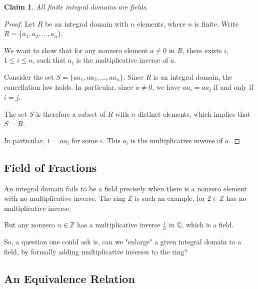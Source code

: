 \documentclass[a4paper,12pt]{report}
\newcounter{statement}
\numberwithin{statement}{chapter}
\newtheorem{claim}[statement]{Claim}
\numberwithin{equation}{chapter}
\numberwithin{section}{chapter}
\numberwithin{subsection}{section}
\begin{document}
\begin{claim}
All finite integral domains are fields.
\end{claim}
\begin{proof}

Let $R$ be an integral domain with $n$ elements, where $n$ is finite.
Write $R = \{a_1, a_2, \ldots, a_{n}\}$.


We want to show that for any nonzero element $a \neq 0$ in $R$,
there exists $i$, $1 \leq i \leq n$,
such that $a_i$ is the multiplicative inverse of $a$.


Consider the set $S = \{aa_1, aa_2,\ldots, aa_{n}\}$.
Since $R$ is an integral domain, the cancellation law holds.
In particular, since $a \neq 0$, we have $aa_i = aa_j$ if and only if $i = j$.


The set $S$ is therefore a subset of $R$ with $n$ distinct elements, which implies that $S = R$.


In particular, $1 = aa_i$ for some $i$.  This $a_i$ is the multiplicative inverse of $a$.


\end{proof}




\subsection{Field of Fractions}

An integral domain fails to be a field precisely when there is a nonzero element
with no multiplicative inverse.
The ring $\mathbb{Z}$ is such an example, for $2 \in \mathbb{Z}$ has no
multiplicative inverse.


But any nonzero $n \in \mathbb{Z}$
has a multiplicative inverse $\frac{1}{n}$ in $\mathbb{Q}$, which is a field.


So, a question one could ask is, can we "enlarge" a given integral domain to a field,
by formally adding multiplicative inverses to the ring?


\subsection{An Equivalence Relation}
\end{document}
